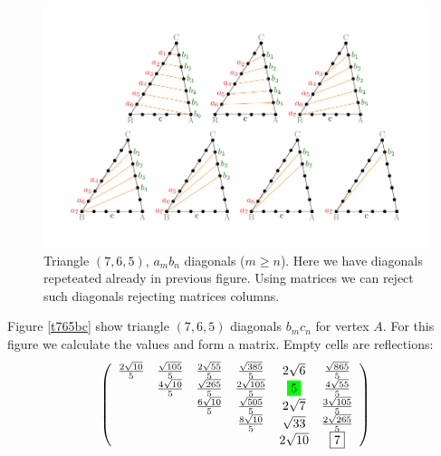 \documentclass[11pt]{article}
\begin{document}
\begin{figure}[htp]
\centering
\includegraphics[scale=1]{t765ab}
\caption{Triangle $(7,6,5)$, $a_mb_n$ diagonals ($m \ge n$).
Here we have diagonals repeteated already in previous figure.
Using matrices we can reject such diagonals rejecting matrices columns.
}
\label{t765ab}
\end{figure}

\newcommand\five{\colorbox{green}{$5$}}

Figure \ref{t765bc} show triangle $(7,6,5)$ diagonals $b_mc_n$ for vertex $A$. For this figure we calculate
the values and form a matrix. Empty cells are reflections:
\begin{equation}\label{eq:appendrow}
\left(\begin{array}{cccccc}
	\frac{2\sqrt{10}}{5} & \frac{\sqrt{105}}{5} & \frac{2\sqrt{55}}{5} & \frac{\sqrt{385}}{5} & 2\sqrt{6} & \frac{\sqrt{865}}{5} \\
	& \frac{4\sqrt{10}}{5} & \frac{\sqrt{265}}{5} & \frac{2\sqrt{105}}{5} & \five & \frac{4\sqrt{55}}{5} \\
	& & \frac{6\sqrt{10}}{5} & \frac{\sqrt{505}}{5} & 2\sqrt{7} & \frac{3\sqrt{105}}{5}\\
	& & & \frac{8\sqrt{10}}{5} & \sqrt{33} & \frac{2\sqrt{265}}{5}\\
	& & & & 2\sqrt{10} & \boxed{7} \\
\end{array}\right)
\end{equation}
\end{document}
